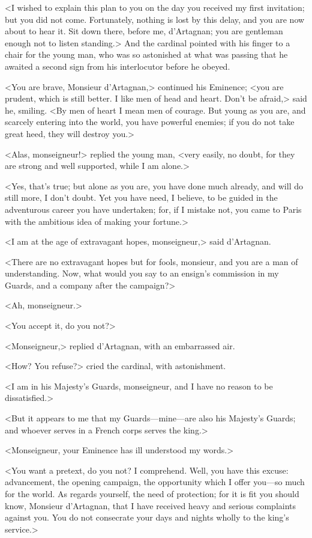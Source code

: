 <I wished to explain this plan to you on the day you received my first invitation; but you did not come. Fortunately, nothing is lost by this delay, and you are now about to hear it. Sit down there, before me, d'Artagnan; you are gentleman enough not to listen standing.> And the cardinal pointed with his finger to a chair for the young man, who was so astonished at what was passing that he awaited a second sign from his interlocutor before he obeyed. 

<You are brave, Monsieur d'Artagnan,> continued his Eminence; <you are prudent, which is still better. I like men of head and heart. Don't be afraid,> said he, smiling. <By men of heart I mean men of courage. But young as you are, and scarcely entering into the world, you have powerful enemies; if you do not take great heed, they will destroy you.> 

<Alas, monseigneur!> replied the young man, <very easily, no doubt, for they are strong and well supported, while I am alone.> 

<Yes, that's true; but alone as you are, you have done much already, and will do still more, I don't doubt. Yet you have need, I believe, to be guided in the adventurous career you have undertaken; for, if I mistake not, you came to Paris with the ambitious idea of making your fortune.> 

<I am at the age of extravagant hopes, monseigneur,> said d'Artagnan. 

<There are no extravagant hopes but for fools, monsieur, and you are a man of understanding. Now, what would you say to an ensign's commission in my Guards, and a company after the campaign?> 

<Ah, monseigneur.> 

<You accept it, do you not?> 

<Monseigneur,> replied d'Artagnan, with an embarrassed air. 

<How? You refuse?> cried the cardinal, with astonishment. 

<I am in his Majesty's Guards, monseigneur, and I have no reason to be dissatisfied.> 

<But it appears to me that my Guards---mine---are also his Majesty's Guards; and whoever serves in a French corps serves the king.> 

<Monseigneur, your Eminence has ill understood my words.> 

<You want a pretext, do you not? I comprehend. Well, you have this excuse: advancement, the opening campaign, the opportunity which I offer you---so much for the world. As regards yourself, the need of protection; for it is fit you should know, Monsieur d'Artagnan, that I have received heavy and serious complaints against you. You do not consecrate your days and nights wholly to the king's service.> 

